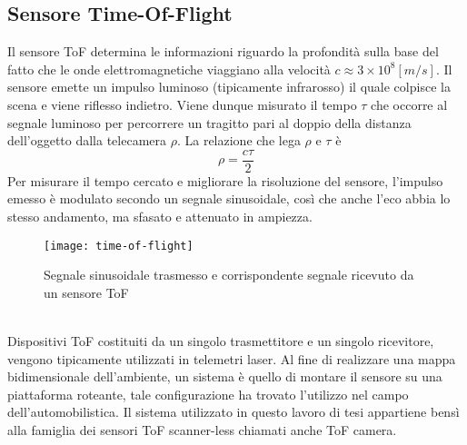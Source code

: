 \subsection{Sensore Time-Of-Flight}
Il sensore ToF determina le informazioni riguardo la profondità sulla base del fatto che le onde elettromagnetiche viaggiano alla velocità \(c\approx3\times 10^8[m/s]\). Il sensore emette un impulso luminoso (tipicamente infrarosso) il quale colpisce la scena e viene riflesso indietro. Viene dunque misurato il tempo $\tau$ che occorre al segnale luminoso per percorrere un tragitto pari al doppio della distanza dell'oggetto dalla telecamera $\rho$. La relazione che lega $\rho$ e $\tau$ è $$\rho=\frac{c\tau}{2}$$
Per misurare il tempo cercato e migliorare la risoluzione del sensore, l'impulso emesso è modulato secondo un segnale sinusoidale, così che anche l'eco abbia lo stesso andamento, ma
sfasato e attenuato in ampiezza.
\begin{figure}[ht]
    \centering
    \texttt{[image: time-of-flight]}
    \caption[Principio time-of-flight]{Segnale sinusoidale trasmesso e corrispondente segnale ricevuto da un sensore ToF}
\end{figure}\\
Dispositivi ToF costituiti da un singolo trasmettitore e un singolo ricevitore, vengono tipicamente utilizzati in telemetri laser. Al fine di realizzare una mappa bidimensionale dell'ambiente, un sistema è quello di montare il sensore su una piattaforma roteante, tale configurazione ha trovato l'utilizzo nel campo dell'automobilistica. Il sistema utilizzato in questo lavoro di tesi appartiene bensì alla famiglia dei sensori ToF scanner-less chiamati anche ToF camera.
